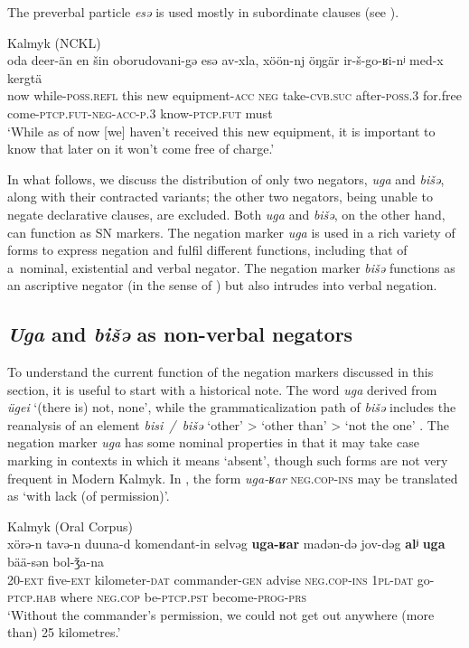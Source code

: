 \documentclass[output=paper,draft,draftmode,colorlinks,citecolor=brown]{langscibook}
\begin{document}
The preverbal particle \textit{esǝ} is used mostly in subordinate clauses (see \citealp{baranova2019a}).

\ea Kalmyk (NCKL) \label{ex:BK33}\\
	\gll oda	deer-än			en		šin		oborudovani-gə	esə	av-xla,			xöön-nj	öŋgär	ir-š-go-ʁi-nʲ	med-x				kergtä\\
	now	while-\textsc{poss.refl}	this	new	equipment-\textsc{acc}	\textsc{neg}	take-\textsc{cvb.suc}	after-\textsc{poss.3}	for.free	come-\textsc{ptcp.fut-neg-acc-p.3}	know-\textsc{ptcp.fut}	must\\
	\glt `While as of now [we] haven’t received this new equipment, it is important to know that later on it won’t come free of charge.'
\z


In what follows, we discuss the distribution of only two negators, \textit{uga} and \textit{bišǝ}, along with their contracted variants; the other two negators, being unable to negate declarative clauses, are excluded. Both \textit{uga} and \textit{bišǝ}, on the other hand, can function as SN markers. The negation marker \textit{uga} is used in a rich variety of forms to express negation and fulfil different functions, including that of a nominal, existential and verbal negator. The negation marker \textit{bišǝ} functions as an ascriptive negator (in the sense of \citealp{Veselinova2015}) but also intrudes into verbal negation. 

\subsection{\textit{Uga} and \textit{bišǝ} as non-verbal negators}\label{sec:BK3.2}

To understand the current function of the negation markers discussed in this section, it is useful to start with a historical note. The word \textit{uga} derived from \textit{ügei} ‘(there is) not, none’, while the grammaticalization path of \textit{bišǝ} includes the reanalysis of an element \textit{bisi / bišǝ} ‘other’ > ‘other than’ > ‘not the one’ \citep[250–251]{janhunen2012a}. The negation marker \textit{uga} has some nominal properties in that it may take case marking in contexts in which it means ‘absent’, though such forms are not very frequent in Modern Kalmyk. In , the form \textit{uga-ʁar} \textsc{neg.cop-ins} may be translated as ‘with lack (of permission)’.

\ea Kalmyk (Oral Corpus) \label{ex:BK34}\\
	\gll xörǝ-n		tavǝ-n	duuna-d			komendant-in		selvǝg	\textbf{uga-ʁar}			madǝn-dǝ	jov-dǝg		\textbf{alʲ}			\textbf{uga}	bää-sǝn		bol-ǯa-na\\
	20-\textsc{ext}	five-\textsc{ext}	kilometer-\textsc{dat}	commander-\textsc{gen}	advise	\textsc{neg.cop-ins}	\textsc{1pl-dat}		go-\textsc{ptcp.hab}	where	\textsc{neg.cop}	be-\textsc{ptcp.pst}	become-\textsc{prog-prs}\\
	\glt `Without the commander’s permission, we could not get out anywhere (more than) 25 kilometres.'
\z
\end{document}
